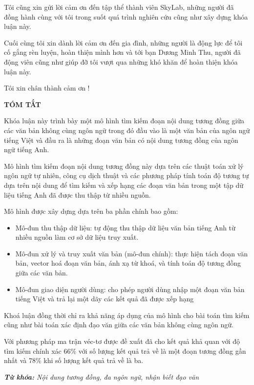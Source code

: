 \documentclass[12pt]{report}
\begin{document}
Tôi cũng xin gửi lời cảm ơn đến tập thể thành viên SkyLab, những người đã đồng hành cùng với tôi trong suốt quá trình nghiên cứu cũng như xây dựng khóa luận này.

Cuối cùng tôi xin dành lời cảm ơn đến gia đình, những người là động lực để tôi cố gắng rèn luyện, hoàn thiện mình hơn và tới bạn Dương Minh Thu, người đã động viên cũng như giúp đỡ tôi vượt qua những khó khăn để hoàn thiện khóa luận này.

Tôi xin chân thành cảm ơn !

	
\newpage
\begin{center}
	\textbf{\large TÓM TẮT}
\end{center}
Khóa luận này trình bày một mô hình tìm kiếm đoạn nội dung tương đồng giữa các văn bản không cùng ngôn ngữ trong đó đầu vào là một văn bản của ngôn ngữ tiếng Việt  và đầu ra là những đoạn văn bản có nội dung tương đồng của ngôn ngữ tiếng Anh.

Mô hình tìm kiếm đoạn nội dung tương đồng này dựa trên các thuật toán xử lý ngôn ngữ tự nhiên, công cụ dịch thuật và các phương pháp tính toán độ tương tự dựa trên nội dung để tìm kiếm và xếp hạng các đoạn văn bản trong một tập dữ liệu tiếng Anh  đã được thu thập từ nhiều nguồn. 

Mô hình được xây dựng dựa trên ba phần chính bao gồm:
\begin{itemize}
	\item Mô-đun thu thập dữ liệu: tự động thu thập dữ liệu văn bản tiếng Anh từ nhiều nguồn làm cơ sở dữ liệu truy xuất.
	\item Mô-đun xử lý và truy xuất văn bản (mô-đun chính): thực hiện tách đoạn văn bản, vector hoá đoạn văn bản, ánh xạ từ khoá, và tính toán độ tương đồng giữa các văn bản.
	\item Mô-đun giao diện người dùng: cho phép người dùng nhập một đoạn văn bản tiếng Việt và trả lại một dãy các kết quả đã được xếp hạng
\end{itemize}

Khoá luận đồng thời chỉ ra khả năng áp dụng của mô hình cho bài toán tìm kiếm cũng như bài toán xác định đạo văn giữa các văn bản không cùng ngôn ngữ. 

Với phương pháp ma trận véc-tơ được đề xuất đã cho kết quả khả quan với độ tìm kiếm chính xác 66\% với số lượng kết quả trả về là một đoạn tương đồng gần nhất và 78\% khi số lượng kết quả trả về là ba. 


\noindent \textit{\textbf{Từ khóa:} Nội dung tương đồng, đa ngôn ngữ, nhận biết đạo văn
}
\end{document}
